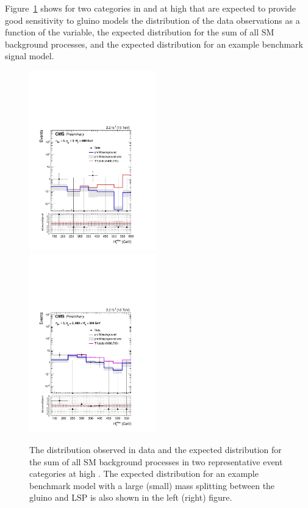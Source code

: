 Figure~\ref{fig:mht-templates} shows for two categories in \njet and
\nb at high \scalht that are expected to provide good sensitivity to
gluino models the distribution of the data observations as a function
of the \mht variable, the expected distribution for the sum of all SM
background processes, and the expected distribution for an example
benchmark signal model.

\begin{figure}[tbhp]
  \begin{center}
    \includegraphics[width=0.49\textwidth]{postFitShape_ge3b_ge5j_800_Inf_prefit} \,
    \includegraphics[width=0.49\textwidth]{postFitShape_eq2b_ge5j_600_800_prefit} \\
  \end{center}
  \caption{ The \mht distribution observed in data and the expected
    distribution for the sum of all SM background processes in two
    representative event categories at high \scalht. The expected
    distribution for an example benchmark model with a large (small)
    mass splitting between the gluino and LSP is also shown in the
    left (right) figure. \label{fig:mht-templates} }
\end{figure}
  
